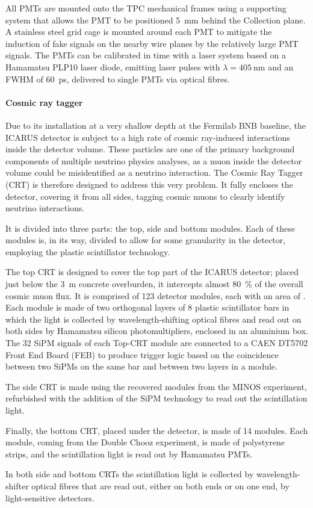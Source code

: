 All PMTs are mounted onto the TPC mechanical frames using a supporting system that allows the PMT to be positioned \SI{5}{\mm} behind the Collection plane. A stainless steel grid cage is mounted around each PMT to mitigate the induction of fake signals on the nearby wire planes by the relatively large PMT signals. The PMTs can be calibrated in time with a laser system based on a Hamamatsu PLP10 laser  diode, emitting laser pulses with $\lambda = \SI{405}{\nm}$ and an FWHM of \SI{60}{ps}, delivered to single PMTs via optical fibres. 

\paragraph{Cosmic ray tagger} Due to its installation at a very shallow depth at the Fermilab BNB baseline, the ICARUS detector is subject to a high rate of cosmic ray-induced interactions inside the detector volume. These particles are one of the primary background components of multiple neutrino physics analyses, as a muon inside the detector volume could be misidentified as a neutrino interaction. The Cosmic Ray Tagger (CRT) is therefore designed to address this very problem. It fully encloses the detector, covering it from all sides, tagging cosmic muons to clearly identify neutrino interactions. 

It is divided into three parts: the top, side and bottom modules. Each of these modules is, in its way, divided to allow for some granularity in the detector, employing the plastic scintillator technology. 

The top CRT is designed to cover the top part of the ICARUS detector; placed just below the \SI{3}{\m} concrete overburden, it intercepts almost \SI{80}{\percent} of the overall cosmic muon flux. It is comprised of 123 detector modules, each with an area of . Each module is made of two orthogonal layers of 8 plastic scintillator bars in which the light is collected by wavelength-shifting optical fibres and read out on both sides by Hamamatsu silicon photomultipliers, enclosed in an aluminium box. The 32 SiPM signals of each Top-CRT module are connected to a CAEN DT5702 Front End  Board (FEB) to produce trigger logic based on  the coincidence between two SiPMs on the same bar and between two layers in a module. 

The side CRT is made using the recovered modules from the MINOS experiment, refurbished with the addition of the SiPM technology to read out the scintillation light.

Finally, the bottom CRT, placed under the detector, is made of 14 modules. Each module, coming from the Double Chooz experiment, is made of polystyrene strips, and the scintillation light is read out by Hamamatsu PMTs. 

In both side and bottom CRTs the scintillation light is collected by wavelength-shifter optical fibres that are read out, either on both ends or on one end, by light-sensitive detectors.  
